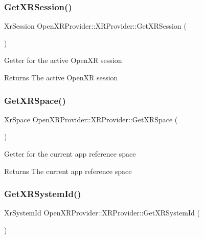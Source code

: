 \subsubsection{\texorpdfstring{GetXRSession()}{GetXRSession()}}
{\footnotesize\ttfamily Xr\+Session Open\+X\+R\+Provider\+::\+X\+R\+Provider\+::\+Get\+X\+R\+Session (\begin{DoxyParamCaption}{ }\end{DoxyParamCaption})\hspace{0.3cm}{\ttfamily [inline]}}

Getter for the active Open\+XR session \begin{DoxyReturn}{Returns}
The active Open\+XR session 
\end{DoxyReturn}
\mbox{\label{class_open_x_r_provider_1_1_x_r_provider_ac5e378a262f30cb57f45bee1508d74de}} 
\subsubsection{\texorpdfstring{GetXRSpace()}{GetXRSpace()}}
{\footnotesize\ttfamily Xr\+Space Open\+X\+R\+Provider\+::\+X\+R\+Provider\+::\+Get\+X\+R\+Space (\begin{DoxyParamCaption}{ }\end{DoxyParamCaption})\hspace{0.3cm}{\ttfamily [inline]}}

Getter for the current app reference space \begin{DoxyReturn}{Returns}
The current app reference space 
\end{DoxyReturn}
\mbox{\label{class_open_x_r_provider_1_1_x_r_provider_a0822cb021219722a9fb6231af4170815}} 
\subsubsection{\texorpdfstring{GetXRSystemId()}{GetXRSystemId()}}
{\footnotesize\ttfamily Xr\+System\+Id Open\+X\+R\+Provider\+::\+X\+R\+Provider\+::\+Get\+X\+R\+System\+Id (\begin{DoxyParamCaption}{ }\end{DoxyParamCaption})\hspace{0.3cm}{\ttfamily [inline]}}

